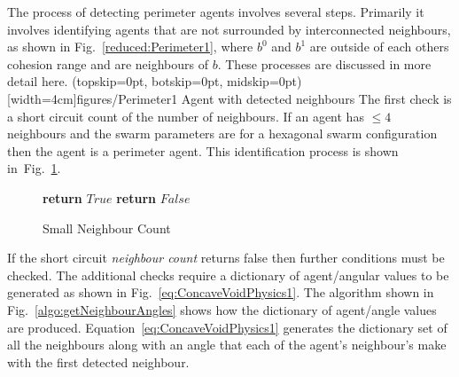\documentclass{ieeeaccess}
\begin{document}
The process of detecting perimeter agents involves several steps. Primarily it involves identifying agents that are not surrounded by interconnected neighbours, as shown in Fig.~\ref{reduced:Perimeter1}, where $b^0$ and $b^1$ are outside of each others cohesion range and are neighbours of $b$. These processes are discussed in more detail here. 
\Figure[t!](topskip=0pt, botskip=0pt, midskip=0pt)[width=4cm]{figures/Perimeter1}
{Agent with detected neighbours\label{reduced:Perimeter1}}
The first check is a short circuit count of the number of neighbours. If an agent has $\leq 4$ neighbours and the swarm parameters are for a hexagonal swarm configuration then the agent is a perimeter agent. This identification process is shown in~Fig.~\ref{algo:SmallNeighbourCount}. 

\begin{figure}
\begin{algorithmic}[1]
{}
   \State\textbf{return} $True$
\EndIf
\State\textbf{return} $False$
\EndProcedure
\end{algorithmic}
\caption{Small Neighbour Count}
\label{algo:SmallNeighbourCount}
\end{figure}

If the short circuit \textit{neighbour count} returns false then further conditions must be checked. The additional checks require a dictionary of agent/angular values to be generated as shown in Fig.~\ref{eq:ConcaveVoidPhysics1}. The algorithm shown in Fig.~\ref{algo:getNeighbourAngles} shows how the dictionary of agent/angle values are produced.   
Equation~\ref{eq:ConcaveVoidPhysics1} generates the dictionary set of all the neighbours along with an angle that each of the agent's neighbour's make with the first detected neighbour.
\end{document}
